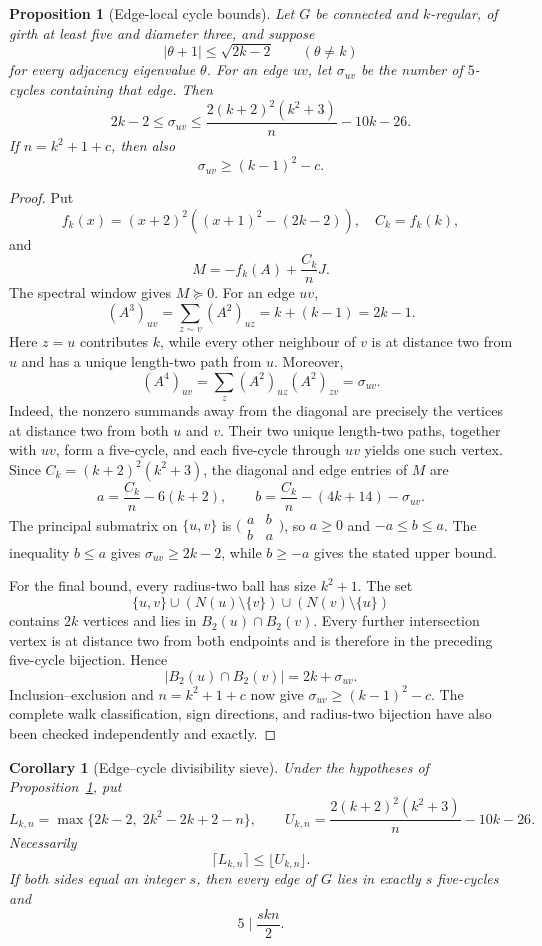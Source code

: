 \documentclass[a4paper,10pt,reqno]{amsart}
\theoremstyle{plain}
\newtheorem{proposition}[theorem]{Proposition}
\newtheorem{corollary}[theorem]{Corollary}
\theoremstyle{definition}
\theoremstyle{remark}
\newcommand{\resultbox}[1]{\boxed{#1}}
\begin{document}
\begin{proposition}[Edge-local cycle bounds]\label{prop:edge-cycle}
Let \(G\) be connected and \(k\)-regular, of girth at least five and diameter
three, and suppose
\[
 |\theta+1|\le\sqrt{2k-2}
 \qquad(\theta\ne k)
\]
for every adjacency eigenvalue \(\theta\).  For an edge \(uv\), let
\(\sigma_{uv}\) be the number of
\(5\)-cycles containing that edge.  Then
\[
 2k-2\le\sigma_{uv}\le
 \frac{2(k+2)^2(k^2+3)}n-10k-26.
\]
If \(n=k^2+1+c\), then also
\[
 \sigma_{uv}\ge(k-1)^2-c.
\]
\end{proposition}

\begin{proof}
Put
\[
 f_k(x)=(x+2)^2((x+1)^2-(2k-2)),
 \quad C_k=f_k(k),
\]
and
\[
 M=-f_k(A)+\frac{C_k}{n}J.
\]
The spectral window gives \(M\succeq0\).  For an edge \(uv\),
\[
 (A^3)_{uv}=\sum_{z\sim v}(A^2)_{uz}=k+(k-1)=2k-1.
\]
Here \(z=u\) contributes \(k\), while every other neighbour of \(v\) is at
distance two from \(u\) and has a unique length-two path from \(u\).
Moreover,
\[
 (A^4)_{uv}=\sum_z(A^2)_{uz}(A^2)_{zv}=\sigma_{uv}.
\]
Indeed, the nonzero summands away from the diagonal are precisely the vertices
at distance two from both \(u\) and \(v\).  Their two unique length-two
paths, together with \(uv\), form a five-cycle, and each five-cycle through
\(uv\) yields one such vertex.  Since
\(C_k=(k+2)^2(k^2+3)\), the diagonal and edge entries of \(M\) are
\[
 a=\frac{C_k}{n}-6(k+2),
 \qquad
 b=\frac{C_k}{n}-(4k+14)-\sigma_{uv}.
\]
The principal submatrix on \(\{u,v\}\) is
\(\bigl(\begin{smallmatrix}a&b\\b&a\end{smallmatrix}\bigr)\), so
\(a\ge0\) and \(-a\le b\le a\).  The inequality \(b\le a\) gives
\(\sigma_{uv}\ge2k-2\), while \(b\ge-a\) gives the stated upper bound.

For the final bound, every radius-two ball has size \(k^2+1\).  The set
\[
 \{u,v\}\cup(N(u)\setminus\{v\})\cup(N(v)\setminus\{u\})
\]
contains \(2k\) vertices and lies in \(B_2(u)\cap B_2(v)\).  Every further
intersection vertex is at distance two from both endpoints and is therefore in
the preceding five-cycle bijection.  Hence
\[
 |B_2(u)\cap B_2(v)|=2k+\sigma_{uv}.
\]
Inclusion--exclusion and \(n=k^2+1+c\) now give
\(\sigma_{uv}\ge(k-1)^2-c\).  The complete walk classification, sign
directions, and radius-two bijection have also been checked independently and
exactly.
\end{proof}

\begin{corollary}[Edge--cycle divisibility sieve]
\label{cor:edge-cycle-sieve}
Under the hypotheses of Proposition~\ref{prop:edge-cycle}, put
\[
 L_{k,n}=\max\{2k-2,\;2k^2-2k+2-n\},
 \qquad
 U_{k,n}=\frac{2(k+2)^2(k^2+3)}{n}-10k-26.
\]
Necessarily
\[
 \resultbox{\lceil L_{k,n}\rceil\le\lfloor U_{k,n}\rfloor.}
\]
If both sides equal an integer \(s\), then every edge of \(G\) lies in
exactly \(s\) five-cycles and
\[
 \resultbox{5\mid \frac{skn}{2}.}
\]
\end{corollary}
\end{document}

